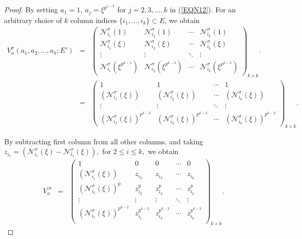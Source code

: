 \documentclass[11pt]{article}
\begin{document}
\begin{proof}
	 By setting $a_1=1, ~a_j = \xi^{p^{j-2}}$ for $j = 2,3,\dots,k$ in (\ref{EQN12}). For an arbitrary choice of 
	$k$ column indices $\{i_1, \dots, i_k\} \subset E$, we obtain
	\begin{eqnarray*}
		V^\sigma_n(a_1,a_2,\dots,a_k;E') &=& 
		\begin{pmatrix}
			\mathcal{N}^\sigma_{i_1}(1) & \mathcal{N}^\sigma_{i_2}(1)& \cdots & \mathcal{N}^\sigma_{i_k}(1) \\
			\mathcal{N}^\sigma_{i_1}(\xi) & \mathcal{N}^\sigma_{i_2}(\xi)&\cdots & \mathcal{N}^\sigma_{i_k}(\xi) \\
			\vdots &\vdots& \ddots & \vdots \\
			\mathcal{N}^\sigma_{i_1}(\xi^{p^{k-1}}) &\mathcal{N}^\sigma_{i_2}(\xi^{p^{k-2}})& \cdots & \mathcal{N}^\sigma_{i_k}(\xi^{p^{k-2}})
		\end{pmatrix}_{k\times k}.\\
		&=&	\begin{pmatrix}
		1 & 1& \cdots & 	1\\
			(\mathcal{N}^\sigma_{i_1}(\xi)) & (\mathcal{N}^\sigma_{i_2}(\xi))&\cdots & (\mathcal{N}^\sigma_{i_k}(\xi)) \\
			\vdots &\vdots& \ddots & \vdots \\
			(\mathcal{N}^\sigma_{i_1}(\xi))^{p^{k-2}} &(\mathcal{N}^\sigma_{i_2}(\xi))^{p^{k-2}}& \cdots & (\mathcal{N}^\sigma_{i_k}(\xi))^{p^{k-2}}
		\end{pmatrix}_{k\times k}.
	\end{eqnarray*}
    
	By subtracting first column from all other columns, and taking $z_{i_r}=(\mathcal{N}^\sigma_{i_r}(\xi)-\mathcal{N}^\sigma_{i_1}(\xi)),$ for $2\leq i\leq k,$ we obtain
	\begin{eqnarray*}
	V^{'\sigma}_n&=&
	\begin{pmatrix}
			1&0&0&\cdots&0\\
			(\mathcal{N}^\sigma_{i_1}(\xi))&z_{i_2}&z_{i_3}&\cdots&z_{i_k}\\
		(\mathcal{N}^\sigma_{i_1}(\xi))^{p}&z^p_{i_2}&z^p_{i_3}&\cdots&z^p_{i_k}\\
		\vdots&\vdots&\vdots&\ddots&\vdots\\
		(\mathcal{N}^\sigma_{i_1}(\xi))^{p^{k-2}}&z^{p^{k-2}}_{i_1}&z^{p^{k-2}}_{i_3}&\cdots&z^{p^{k-2}}_{i_k}\\
		\end{pmatrix}_{k\times k}.
	\end{eqnarray*}
    

\end{proof}
\end{document}
